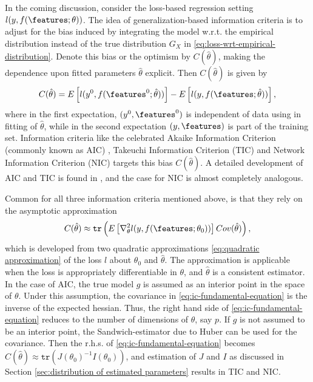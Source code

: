 In the coming discussion, consider the loss-based regression setting $l(y,f(\features;\theta))$.
The idea of generalization-based information criteria is to adjust for the bias induced by integrating the model w.r.t. the empirical distribution instead of the true distribution $G_X$ in \eqref{eq:loss-wrt-empirical-distribution}.
Denote this bias or the optimism by $C(\hat{\theta})$, making the dependence upon fitted parameters $\hat\theta$ explicit.
Then $C(\hat\theta)$ is given by
\begin{align}\label{eq:information criterion bias}
	C(\hat\theta) = E\left[ l(y^0,f(\features^0;\hat{\theta}))\right] - E\left[ l(y,f(\features;\hat{\theta}))\right],
\end{align}
where in the first expectation, $(y^0,\features^0)$ is independent of data using in fitting of $\hat\theta$, while in the second expectation $(y,\features)$ is part of the training set.
Information criteria like the celebrated Akaike Information Criterion (commonly known as AIC) \citep{akaike1974new}, Takeuchi Information Criterion (TIC) \citep{takeuchi1976distribution} and Network Information Criterion (NIC) \citep{murata1994network} targets this bias $C(\hat\theta)$.
A detailed development of AIC and TIC is found in \citet{burnham2003model}, and the case for NIC is almost completely analogous.

Common for all three information criteria mentioned above, is that they rely on the asymptotic approximation
\begin{align}\label{eq:ic-fundamental-equation}
	C(\hat\theta) \approx \texttt{tr}\left( E\left[ \nabla_\theta^2l(y,f(\features;\theta_0))\right]Cov(\hat\theta)\right),
\end{align}
which is developed from two quadratic approximations \eqref{eq:quadratic approximation} of the loss $l$ about $\theta_0$ and $\hat\theta$.
The approximation is applicable when the loss is appropriately differentiable in $\theta$, and $\hat\theta$ is a consistent estimator.
In the case of AIC, the true model $g$ is assumed as an interior point in the space of $\theta$.
Under this assumption, the covariance in \eqref{eq:ic-fundamental-equation} is the inverse of the expected hessian. Thus, the right hand side of \eqref{eq:ic-fundamental-equation} reduces to the number of dimensions of $\theta$, say $p$.
If $g$ is not assumed to be an interior point, the Sandwich-estimator due to Huber \citep{huber1967behavior} can be used for the covariance.
Then the r.h.s. of \eqref{eq:ic-fundamental-equation} becomes $C(\hat\theta)\approx\texttt{tr}(J(\theta_0)^{-1}I(\theta_0))$, and estimation of $J$ and $I$ as discussed in Section \ref{sec:distribution of estimated parameters} results in TIC and NIC.

